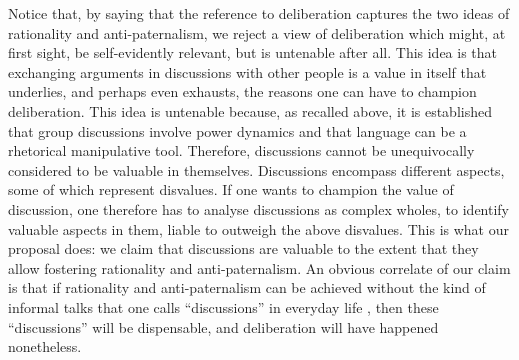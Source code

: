 \documentclass[version=3.21, pagesize, twoside=off, bibliography=totoc, DIV=calc, fontsize=12pt, a4paper, french, english]{scrartcl}
\begin{document}

Notice that, by saying that the reference to deliberation captures the two ideas of rationality and anti-paternalism, we reject a view of deliberation which might, at first sight, be self-evidently relevant, but is untenable after all. This idea is that exchanging arguments in discussions with other people is a value in itself that underlies, and perhaps even exhausts, the reasons one can have to champion deliberation. %
This idea is untenable because, as recalled above, it is established that group discussions involve power dynamics and that language can be a rhetorical manipulative tool. Therefore, discussions cannot be unequivocally considered to be valuable in themselves. Discussions encompass different aspects, some of which represent disvalues. If one wants to champion the value of discussion, one therefore has to analyse discussions as complex wholes, to identify valuable aspects in them, liable to outweigh the above disvalues. This is what our proposal does: we claim that discussions are valuable to the extent that they allow fostering rationality and anti-paternalism. An obvious correlate of our claim is that if rationality and anti-paternalism can be achieved without the kind of informal talks that one calls “discussions” in everyday life%
, then these “discussions” will be dispensable, and deliberation will have happened nonetheless.
\end{document}
